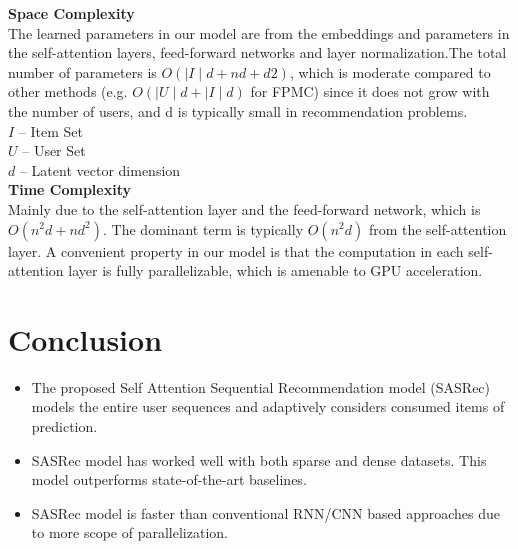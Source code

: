 \documentclass[11pt]{article}
\begin{document}
		\textbf{Space Complexity }\\ 
		\quad The learned parameters in our model
are from the embeddings and parameters in the self-attention
layers, feed-forward networks and layer normalization.The total number of parameters is $O(\mid I \mid d + nd + d2)$, which is moderate compared to other methods (e.g. $O(\mid U \mid d + \mid I \mid d)$ for FPMC) since it does not grow with the number of users, and d is typically small in recommendation problems.\\$I$ – Item Set \\$U$ – User Set \\$d$ – Latent vector dimension\\


\textbf{Time Complexity} \\
		Mainly due to the self-attention layer and the feed-forward network, which is $O(n^{2}d + nd^{2})$. The dominant term is typically $O(n^{2}d)$ from the self-attention layer. A convenient property in our model is that the computation in each self-attention layer is fully parallelizable, which is amenable to GPU acceleration.

\section{Conclusion}

\begin{itemize}
\item The proposed Self Attention Sequential Recommendation model (SASRec) models the entire user sequences and adaptively considers consumed items of prediction. 
\item SASRec model has worked well with both sparse and dense datasets. This model outperforms state-of-the-art baselines. 
\item SASRec model is faster than conventional RNN/CNN based approaches due to more scope of parallelization.

\end{itemize}



\end{document}
